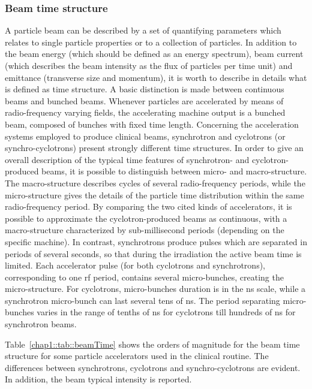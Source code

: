 \subsubsection{Beam time structure}\label{chap1::subsubsection::beamTimeStruct}

A particle beam can be described by a set of quantifying parameters which relates to single particle properties or to a collection of particles. In addition to the beam energy (which should be defined as an energy spectrum), beam current (which describes the beam intensity as the flux of particles per time unit) and emittance (transverse size and momentum), it is worth to describe in details what is defined as time structure. A basic distinction is made between continuous beams and bunched beams. Whenever particles are accelerated by means of radio-frequency varying fields, the accelerating machine output is a bunched beam, composed of bunches with fixed time length. Concerning the acceleration systems employed to produce clinical beams, synchrotron and cyclotrons (or synchro-cyclotrons) present strongly different time structures. In order to give an overall description of the typical time features of synchrotron- and cyclotron-produced beams, it is possible to distinguish between micro- and macro-structure. The macro-structure describes cycles of several radio-frequency periods, while the micro-structure gives the details of the particle time distribution within the same radio-frequency period. By comparing the two cited kinds of accelerators, it is possible to approximate the cyclotron-produced beams as continuous, with a macro-structure characterized by sub-millisecond periods (depending on the specific machine). In contrast, synchrotrons produce pulses which are separated in periods of several seconds, so that during the irradiation the active beam time is limited. Each accelerator pulse (for both cyclotrons and synchrotrons), corresponding to one \gls{rf} period, contains several micro-bunches, creating the micro-structure. For cyclotrons, micro-bunches duration is in the ns scale, while a synchrotron micro-bunch can last several tens of ns. The period separating micro-bunches varies in the range of tenths of ns for cyclotrons till hundreds of ns for synchrotron beams. 

Table~\ref{chap1::tab::beamTime} shows the orders of magnitude for the beam time structure for some particle accelerators used in the clinical routine. The differences between synchrotrons, cyclotrons and synchro-cyclotrons are evident. In addition, the beam typical intensity is reported.

